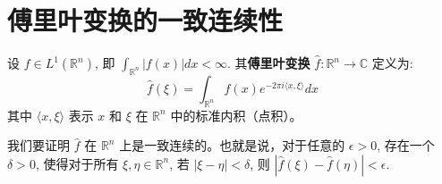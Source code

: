 \section{傅里叶变换的一致连续性}

\begin{definition}
设 $f \in L^1(\mathbb{R}^n)$, 即 $\int_{\mathbb{R}^n} |f(x)| dx < \infty$. 其\textbf{傅里叶变换} $\widehat{f}: \mathbb{R}^n \to \mathbb{C}$ 定义为:
\[
\widehat{f}(\xi) = \int_{\mathbb{R}^n} f(x) e^{-2\pi i \langle x, \xi \rangle} dx
\]其中 $\langle x, \xi \rangle$ 表示 $x$ 和 $\xi$ 在 $\mathbb{R}^n$ 中的标准内积（点积）。
\end{definition}
我们要证明 $\widehat{f}$ 在 $\mathbb{R}^n$ 上是一致连续的。也就是说，对于任意的 $\epsilon > 0$, 存在一个 $\delta > 0$, 使得对于所有 $\xi, \eta \in \mathbb{R}^n$, 若 $|\xi - \eta| < \delta$, 则 $|\widehat{f}(\xi) - \widehat{f}(\eta)| < \epsilon$.

